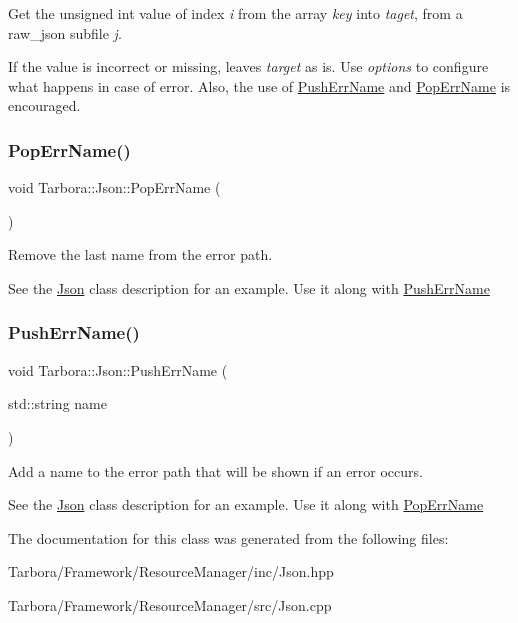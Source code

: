 Get the unsigned int value of index {\itshape i} from the array {\itshape key} into {\itshape taget}, from a raw\+\_\+json subfile {\itshape j}. 

If the value is incorrect or missing, leaves {\itshape target} as is. Use {\itshape options} to configure what happens in case of error. Also, the use of \hyperlink{classTarbora_1_1Json_a061eac4f16dac3b9b3a26a66de0ea8f0}{Push\+Err\+Name} and \hyperlink{classTarbora_1_1Json_a14019f06d3bd76edd6a6e78134519d11}{Pop\+Err\+Name} is encouraged. \mbox{\label{classTarbora_1_1Json_a14019f06d3bd76edd6a6e78134519d11}} 
\subsubsection{\texorpdfstring{Pop\+Err\+Name()}{PopErrName()}}
{\footnotesize\ttfamily void Tarbora\+::\+Json\+::\+Pop\+Err\+Name (\begin{DoxyParamCaption}{ }\end{DoxyParamCaption})}



Remove the last name from the error path. 

See the \hyperlink{classTarbora_1_1Json}{Json} class description for an example. Use it along with \hyperlink{classTarbora_1_1Json_a061eac4f16dac3b9b3a26a66de0ea8f0}{Push\+Err\+Name} \mbox{\label{classTarbora_1_1Json_a061eac4f16dac3b9b3a26a66de0ea8f0}} 
\subsubsection{\texorpdfstring{Push\+Err\+Name()}{PushErrName()}}
{\footnotesize\ttfamily void Tarbora\+::\+Json\+::\+Push\+Err\+Name (\begin{DoxyParamCaption}\item[{std\+::string}]{name }\end{DoxyParamCaption})}



Add a name to the error path that will be shown if an error occurs. 

See the \hyperlink{classTarbora_1_1Json}{Json} class description for an example. Use it along with \hyperlink{classTarbora_1_1Json_a14019f06d3bd76edd6a6e78134519d11}{Pop\+Err\+Name} 

The documentation for this class was generated from the following files\+:\begin{DoxyCompactItemize}
\item 
Tarbora/\+Framework/\+Resource\+Manager/inc/Json.\+hpp\item 
Tarbora/\+Framework/\+Resource\+Manager/src/Json.\+cpp\end{DoxyCompactItemize}
